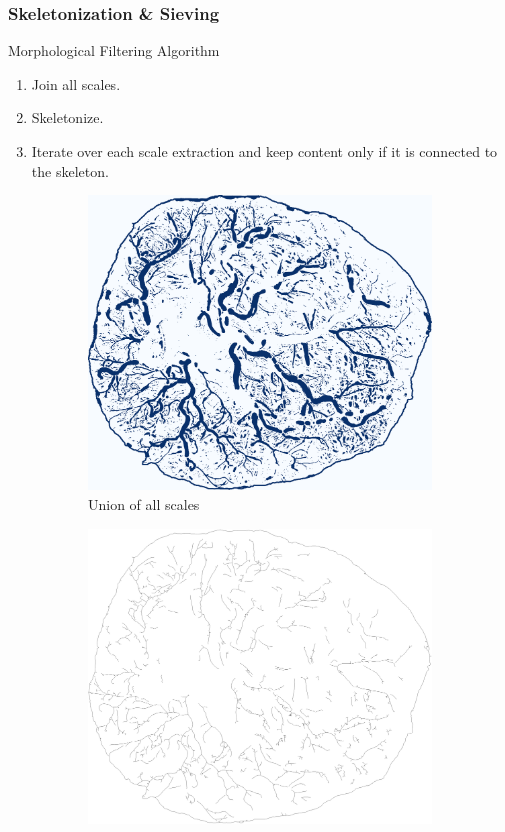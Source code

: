 \documentclass[9pt]{beamer}
\begin{document}
\begin{frame}
	\frametitle{Skeletonization \& Sieving}
	\begin{block}{Morphological Filtering Algorithm}
		\begin{enumerate}[\bfseries(a)]
			\item Join all scales.
			\item Skeletonize.
			\item Iterate over each scale extraction and keep content only if it is connected to the skeleton.
		\end{enumerate}
	\end{block}
	\begin{figure}
		\begin{subfigure}[b]{0.30\textwidth}
			\includegraphics[width=\textwidth]{D-cumulative_binary}
			\caption{Union of all scales}
		\end{subfigure}
		\begin{subfigure}[b]{0.30\textwidth}
			\includegraphics[width=\textwidth]{F-small_skel}

\end{subfigure}
\end{figure}
\end{frame}
\end{document}
